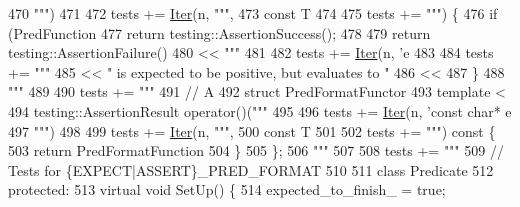 \begin{DoxyCode}
{{{{{{{{{{{{{{{{{{{{{{{{{{470 \textcolor{stringliteral}{                                             """})
471 
472   tests += \hyperlink{namespacegen__gtest__pred__impl_ac016218b7c9437d1d5ac85c574c83069}{Iter}(n, \textcolor{stringliteral}{""",}
473 \textcolor{stringliteral}{                                             const T%
474 
475   tests += \textcolor{stringliteral}{""") \{}
476 \textcolor{stringliteral}{  if (PredFunction%
477 \textcolor{stringliteral}{    return testing::AssertionSuccess();}
478 \textcolor{stringliteral}{}
479 \textcolor{stringliteral}{  return testing::AssertionFailure()}
480 \textcolor{stringliteral}{      << """} %
481 
482   tests += \hyperlink{namespacegen__gtest__pred__impl_ac016218b7c9437d1d5ac85c574c83069}{Iter}(n, \textcolor{stringliteral}{'e%
483 
484   tests += \textcolor{stringliteral}{"""}
485 \textcolor{stringliteral}{      << " is expected to be positive, but evaluates to "}
486 \textcolor{stringliteral}{      << %
487 \textcolor{stringliteral}{\}}
488 \textcolor{stringliteral}{"""} %
489 
490   tests += \textcolor{stringliteral}{"""}
491 \textcolor{stringliteral}{// A %
492 \textcolor{stringliteral}{struct PredFormatFunctor%
493 \textcolor{stringliteral}{  template <%
494 \textcolor{stringliteral}{  testing::AssertionResult operator()("""} %
495 
496   tests += \hyperlink{namespacegen__gtest__pred__impl_ac016218b7c9437d1d5ac85c574c83069}{Iter}(n, \textcolor{stringliteral}{'const char* e%
497 \textcolor{stringliteral}{                                      """})
498 
499   tests += \hyperlink{namespacegen__gtest__pred__impl_ac016218b7c9437d1d5ac85c574c83069}{Iter}(n, \textcolor{stringliteral}{""",}
500 \textcolor{stringliteral}{                                      const T%
501 
502   tests += \textcolor{stringliteral}{""") const \{}
503 \textcolor{stringliteral}{    return PredFormatFunction%
504 \textcolor{stringliteral}{  \}}
505 \textcolor{stringliteral}{\};}
506 \textcolor{stringliteral}{"""} %
507 
508   tests += \textcolor{stringliteral}{"""}
509 \textcolor{stringliteral}{// Tests for \{EXPECT|ASSERT\}\_PRED\_FORMAT%
510 \textcolor{stringliteral}{}
511 \textcolor{stringliteral}{class Predicate%
512 \textcolor{stringliteral}{ protected:}
513 \textcolor{stringliteral}{  virtual void SetUp() \{}
514 \textcolor{stringliteral}{    expected\_to\_finish\_ = true;}
}}}}}}}}}}}}}}}}}}}}}}}}}}}}}}}}}}}}}}
\end{DoxyCode}
